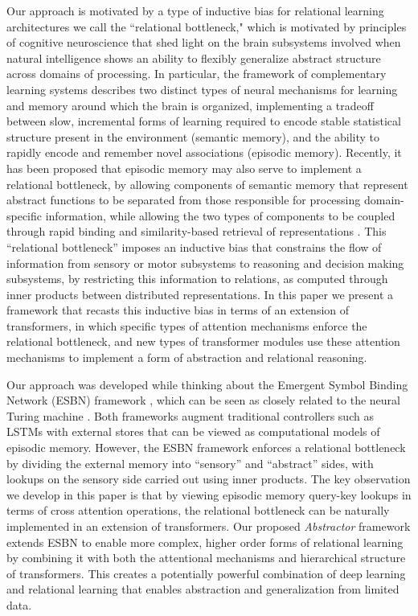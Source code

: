 Our approach is motivated by a type of inductive bias for relational learning architectures we call the
``relational bottleneck," which is motivated by principles of cognitive neuroscience that shed light on the brain
subsystems involved when natural intelligence shows an ability to flexibly generalize abstract structure across
domains of processing. In particular, the framework of complementary learning systems \citep{McClelland:1995,
    Kumaran:2016} describes two distinct types of neural mechanisms for learning and memory around which the brain
is organized, implementing a tradeoff between slow, incremental forms of learning required to encode stable statistical
structure present in the environment (semantic memory), and the ability to rapidly encode and remember novel
associations
(episodic memory).
Recently, it has been proposed that episodic memory may also serve to implement a relational bottleneck,
by allowing components of semantic memory that represent abstract functions to be separated from those
responsible for processing domain-specific information, while allowing the two types of components to be coupled
through rapid binding and similarity-based retrieval of representations \citep{esbn}.
This
``relational bottleneck'' imposes an inductive bias that constrains the flow of information from sensory or motor subsystems to reasoning and
decision making subsystems, by restricting this information to relations, as computed through inner products
between distributed representations. In this paper we present a framework that
recasts
this inductive bias in terms of an extension of transformers, in which specific types of attention mechanisms enforce
the relational bottleneck, and new types of transformer modules use these attention mechanisms to implement a form of
abstraction and relational reasoning.

Our approach was developed while thinking about the Emergent Symbol Binding Network (ESBN) framework \citep{esbn}, which can be seen as closely related to the neural Turing machine \citep{NTM}. Both frameworks augment traditional controllers such as LSTMs with external stores that can be viewed as computational models of episodic memory. However, the ESBN framework enforces a relational bottleneck by dividing the external memory into ``sensory'' and ``abstract'' sides, with lookups on the sensory side carried out using inner products. The key observation we develop in this paper is that by viewing episodic memory query-key lookups in terms of cross attention operations, the relational bottleneck can be naturally implemented in an extension of transformers. Our proposed \textit{Abstractor} framework extends ESBN to
enable more complex, higher order forms of relational learning by combining it with both the attentional mechanisms
and hierarchical structure of transformers. This creates a potentially powerful combination of deep learning and
relational learning that enables abstraction and generalization from limited data.
